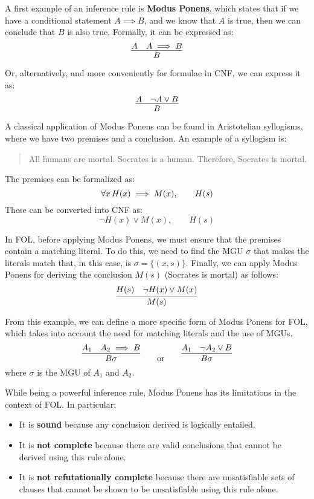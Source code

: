 A first example of an inference rule is \textbf{Modus Ponens}, which states that if we have a conditional statement \(A \implies B\), and we know that \(A\) is true, then we can conclude that \(B\) is also true. Formally, it can be expressed as:
\begin{equation}  
  \infer{B}{A & A \implies B}
\end{equation}


Or, alternatively, and more conveniently for formulae in CNF, we can express it as:
\begin{equation}  
  \infer{B}{A & \neg A \lor B}
\end{equation}

A classical application of Modus Ponens can be found in Aristotelian syllogisms, where we have two premises and a conclusion.
An example of a syllogism is:
\begin{quote}
  All humans are mortal. Socrates is a human. Therefore, Socrates is mortal.
\end{quote}
The premises can be formalized as:
\begin{equation}
  \forall x \, H(x) \implies M(x), \qquad H(s)
\end{equation}
These can be converted into CNF as:
\begin{equation}
    \neg H(x) \lor M(x), \qquad H(s)
\end{equation}

In FOL, before applying Modus Ponens, we must ensure that the premises contain a matching literal. To do this, we need to find the MGU \(\sigma\) that makes the literals match that, in this case, is \(\sigma = \{(x,s)\}\).
Finally, we can apply Modus Ponens for deriving the conclusion \(M(s)\) (Socrates is mortal) as follows:
\begin{equation}
  \infer{M(s)}{H(s) & \neg H(x) \lor M(x)}
\end{equation}

From this example, we can define a more specific form of Modus Ponens for FOL, which takes into account the need for matching literals and the use of MGUs.
\begin{equation}  
  \infer{B\sigma}{A_1 & A_2 \implies B} \qquad \text{or} \qquad \infer{B\sigma}{A_1 & \neg A_2 \lor B}
\end{equation}
where \(\sigma\) is the MGU of \(A_1\) and \(A_2\).

While being a powerful inference rule, Modus Ponens has its limitations in the context of FOL\@.
In particular:
\begin{itemize}
  \item It is \textbf{sound} because any conclusion derived is logically entailed.
  \item It is \textbf{not complete} because there are valid conclusions that cannot be derived using this rule alone.
  \item It is \textbf{not refutationally complete} because there are unsatisfiable sets of clauses that cannot be shown to be unsatisfiable using this rule alone.
\end{itemize}

